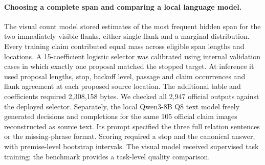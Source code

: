 \paragraph{Choosing a complete span and comparing a local language model.}
The visual count model stored estimates of the most frequent hidden span for the two immediately visible flanks, either single flank and a marginal distribution. Every training claim contributed equal mass across eligible span lengths and locations. A 15-coefficient logistic selector was calibrated using internal validation cases in which exactly one proposal matched the stopped target. At inference it used proposal lengths, stop, backoff level, passage and claim occurrences and flank agreement at each proposed source location. The additional table and coefficients required 2,308,158 bytes. We checked all 2,947 official outputs against the deployed selector. Separately, the local Qwen3-8B Q8 text model freely generated decisions and completions for the same 105 official claim images reconstructed as source text. Its prompt specified the three full relation sentences or the missing-phrase format. Scoring required a stop and the canonical answer, with premise-level bootstrap intervals. The visual model received supervised task training; the benchmark provides a task-level quality comparison.
